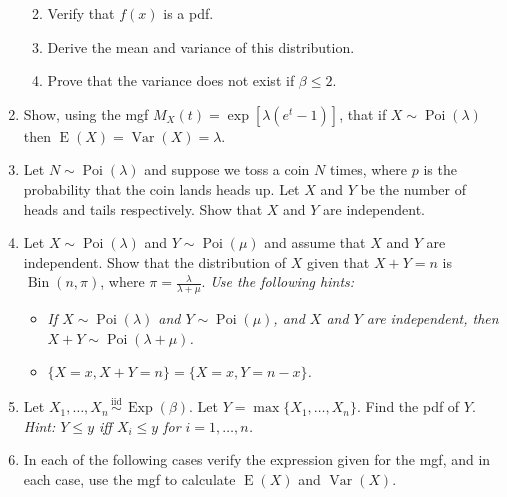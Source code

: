 \documentclass[
]{book}
\DeclareMathOperator{\E}{E}
\DeclareMathOperator{\Var}{Var}
\DeclareMathOperator{\Bin}{Bin}
\DeclareMathOperator{\Pois}{Poi}
\DeclareMathOperator{\Exp}{Exp}
\newcommand{\iid}{\,\overset{\text{iid}}{\sim}\,}
\theoremstyle{definition}
\theoremstyle{definition}
\theoremstyle{definition}
\theoremstyle{definition}
\theoremstyle{remark}
\begin{document}
\begin{enumerate}
  \begin{enumerate}
  \def\labelenumii{(\alph{enumii})}
  \item
    Verify that \(f(x)\) is a pdf.
  \item
    Derive the mean and variance of this distribution.
  \item
    Prove that the variance does not exist if \(\beta \leq 2\).
  \end{enumerate}
\item
  Show, using the mgf \(M_X(t)=\exp[\lambda(e^t-1)]\), that if \(X\sim\Pois(\lambda)\) then \(\E(X)=\Var(X)=\lambda\).
\item
  Let \(N\sim\Pois(\lambda)\) and suppose we toss a coin \(N\) times, where \(p\) is the probability that the coin lands heads up. Let \(X\) and \(Y\) be the number of heads and tails respectively. Show that \(X\) and \(Y\) are independent.
\item
  Let \(X\sim\Pois(\lambda)\) and \(Y\sim\Pois(\mu)\) and assume that \(X\) and \(Y\) are independent. Show that the distribution of \(X\) given that \(X+Y=n\) is \(\Bin(n,\pi)\), where \(\pi=\frac{\lambda}{\lambda + \mu}\).
  \emph{Use the following hints:}

  \begin{itemize}
  \item
    \emph{If \(X\sim\Pois(\lambda)\) and \(Y\sim\Pois(\mu)\), and \(X\) and \(Y\) are independent, then \(X+Y\sim\Pois(\lambda + \mu)\).}
  \item
    \emph{\(\{X=x,X+Y=n \}=\{X=x,Y=n-x \}\).}
  \end{itemize}
\item
  Let \(X_1,\dots,X_n\iid \Exp(\beta)\). Let \(Y=\max\{X_1,\dots,X_n\}\). Find the pdf of \(Y\). \emph{Hint: \(Y\leq y\) iff \(X_i\leq y\) for \(i=1,\dots,n\).}
\item
  In each of the following cases verify the expression given for the mgf, and in each case, use the mgf to calculate \(\E(X)\) and \(\Var(X)\).


\end{enumerate}
\end{document}
